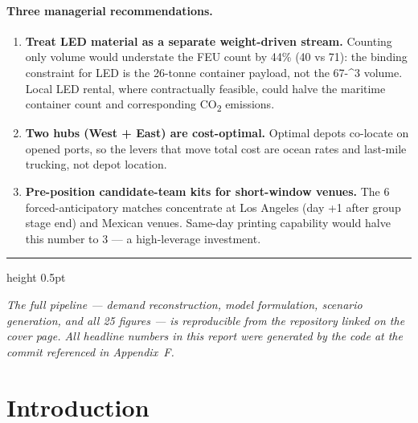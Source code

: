 \documentclass[11pt,a4paper]{article}
\numberwithin{equation}{section}
\newcommand{\mcube}{\text{m}^{3}}
\begin{document}
\paragraph{Three managerial recommendations.}
\begin{enumerate}[leftmargin=*,itemsep=2pt,topsep=2pt]
\item \textbf{Treat LED material as a separate weight-driven stream.} Counting only volume would understate the FEU count by 44\% (40 vs 71): the binding constraint for LED is the 26-tonne container payload, not the 67-\mcube{} volume. Local LED rental, where contractually feasible, could halve the maritime container count and corresponding CO\textsubscript{2} emissions.
\item \textbf{Two hubs (West + East) are cost-optimal.} Optimal depots co-locate on opened ports, so the levers that move total cost are ocean rates and last-mile trucking, not depot location.
\item \textbf{Pre-position candidate-team kits for short-window venues.} The 6 forced-anticipatory matches concentrate at Los Angeles (day +1 after group stage end) and Mexican venues. Same-day printing capability would halve this number to 3 — a high-leverage investment.
\end{enumerate}

\vspace{0.5em}
\hrule height 0.5pt
\vspace{0.3em}

\noindent\small\textit{The full pipeline — demand reconstruction, model formulation, scenario generation, and all 25 figures — is reproducible from the repository linked on the cover page. All headline numbers in this report were generated by the code at the commit referenced in Appendix~F.}

\newpage

\renewcommand{\contentsname}{\color{NavyFIFA}Contents}
\tableofcontents
\newpage

\setcounter{page}{1}

\section{Introduction}\label{sec:intro}
\end{document}

